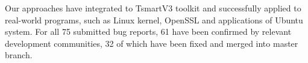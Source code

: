 \begin{eabstract}
	Our approaches have integrated to TsmartV3 toolkit and successfully applied to real-world programs, such as Linux kernel, OpenSSL and applications of Ubuntu system.
	For all 75 submitted bug reports, 61 have been confirmed by relevant development communities, 32 of which have been fixed and merged into master branch.
	
\end{eabstract}
